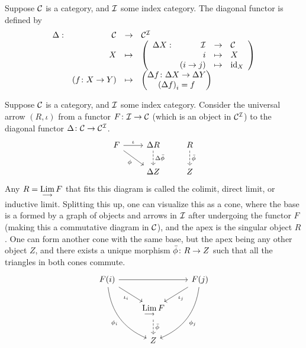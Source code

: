 \begin{definition}
    Suppose \(\mathcal{C}\) is a category, and \(\mathcal{I}\) some index category.
    The diagonal functor is defined by
    \begin{equation*}
        \begin{array}{rrcl}
            \Delta: & \mca{C} &\to& \mca{C}^\mca{I} \\
            & X &\mapsto& \pqty{\varfunct{\Delta X}{\mca{I}}{\mca{C}}{i}{X}{(i \to j)}{\id_X}} \\
            & (\func{f}{X}{Y}) &\mapsto& \pqty{\mqty{\func{\Delta f}{\Delta X}{\Delta Y} \\ {(\Delta f)}_i = f}}
        \end{array}
    \end{equation*}
\end{definition}
\begin{definition}
    Suppose \(\mathcal{C}\) is a category, and \(\mathcal{I}\) some index category.
    Consider the universal arrow \((R,\iota)\)
    from a functor \(F\colon\mathcal{I}\to\mathcal{C}\) (which is an object in \(\mathcal{C}^{\mathcal{I}}\))
    to the diagonal functor \(\Delta\colon\mathcal{C}\to\mathcal{C}^{\mathcal{I}}\).
    \begin{equation*}
        \begin{tikzcd}
            F \arrow{r}{\iota} \arrow{rd}[swap]{\phi} &
            \Delta R \arrow[dashrightarrow]{d}{\Delta\bar{\phi}} &
            R \arrow[dashrightarrow]{d}{\bar{\phi}} \\
            & \Delta Z & Z
        \end{tikzcd}
    \end{equation*}
    Any \(R = \operatorname{\displaystyle\operatorname*{Lim}_{\longrightarrow}} F\) that fits this diagram is called the colimit, direct limit, or inductive limit.
    Splitting this up, one can visualize this as a cone,
    where the base is a formed by a graph of objects and arrows in \(\mathcal{I}\)
    after undergoing the functor \(F\) (making this a commutative diagram in \(\mathcal{C}\)),
    and the apex is the singular object \(R\).
    One can form another cone with the same base, but the apex being any other object \(Z\),
    and there exists a unique morphism \(\bar{\phi}\colon R\to Z\) such that all the triangles in both cones commute.
    \begin{equation*}
        \begin{tikzcd}
            F(i) \arrow{rr} \arrow{dr}[swap]{\iota_i} \arrow[bend right]{ddr}[swap]{\phi_i} &&
            F(j) \arrow{dl}{\iota_j} \arrow[bend left]{ddl}{\phi_j} \\
            & \dirLim F \arrow[dashrightarrow]{d}{\bar{\phi}} \\
            & Z
        \end{tikzcd}
    \end{equation*}
\end{definition}

